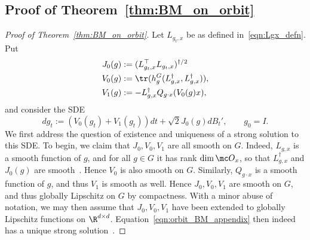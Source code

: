 \documentclass[twoside,a4paper,11pt]{article}
\theoremstyle{plain}
\begin{document}
\subsection{Proof of Theorem~\ref{thm:BM_on_orbit}}
\begin{proof}[Proof of Theorem~\ref{thm:BM_on_orbit}] Let
$L_{g_t, x}$ be as defined in~\eqref{eqn:Lgx_defn}. Put
\begin{align*}
J_0(g) &:= (L_{g_t, x}^\top  L_{g_t, x})^{\dagger/2} \\
V_0(g) &:= \tr(h_g^G(L^{\dagger}_{g, x},  L^{\dagger}_{g, x})), \\
V_1(g) &:= - L_{g, x}^{\dagger}Q_{g \cdot x}(V_0(g)x),
\end{align*} and
consider the SDE
\begin{equation}\label{eqn:orbit_BM_appendix}
dg_t := (V_0(g_t) + V_1(g_t))dt + \sqrt{2}J_0(g)dB_t',
\quad \quad g_0 = I.
\end{equation}
We first address the question of existence and uniqueness
of a strong solution to this SDE.
To begin, we claim that $J_0, V_0, V_1$ are all
smooth on $G$.
Indeed, $L_{g, x}$ is a smooth function
of $g$, and for all $g \in G$ it has rank $\dim \mc O_x$,
so that $L_{g,x}^{\dagger}$ and $J_0(g)$ are smooth~\cite{constales1998closed}.
Hence $V_0$ is also smooth
on $G$.
Similarly, $Q_{g\cdot x}$ is a smooth
function of $g$, and thus $V_1$ is smooth
as well.
Hence $J_0, V_0, V_1$ are smooth
on $G$,
and thus globally Lipschitz on $G$ by compactness.
With a minor abuse of notation, we may then assume that $J_0, V_0, V_1$
have been extended to globally Lipschitz functions on $\R^{d \times d}$.
Equation~\eqref{eqn:orbit_BM_appendix}
then indeed
has a unique strong solution~\cite[Theorem 5.2.1]{oksendal2013stochastic}.





\end{proof}
\end{document}

